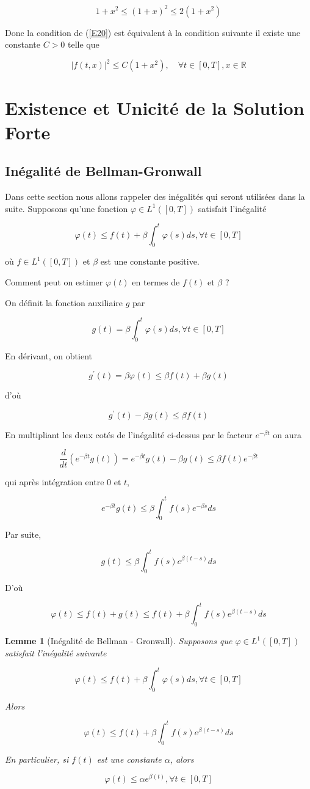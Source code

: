 \documentclass[A4paper,12pt]{report}
\newtheorem{lemma}{Lemme}[chapter]
\begin{document}
$$
1+x^{2} \leq(1+x)^{2} \leq 2\left(1+x^{2}\right)
$$

Donc la condition de (\ref{E20}) est équivalent à la condition suivante il existe une constante $C>0$ telle que

$$
|f(t, x)|^{2} \leq C\left(1+x^{2}\right), \quad \forall t \in [0, T], x \in \mathbb{R}
$$
\section{Existence et Unicité de la Solution Forte}


\subsection{Inégalité de Bellman-Gronwall}
Dans cette section nous allons rappeler des inégalités qui seront utilisées dans la suite. Supposons qu'une fonction $\varphi \in L^{1}([0, T])$ satisfait l'inégalité

$$
\varphi(t) \leq f(t)+\beta \int_{0}^{t} \varphi(s) d s, \forall t \in[0, T]
$$

où $f \in L^{1}([0, T])$ et $\beta$ est une constante positive.

Comment peut on estimer $\varphi(t)$ en termes de $f(t)$ et $\beta$ ?

On définit la fonction auxiliaire $g$ par

$$
g(t)=\beta \int_{0}^{t} \varphi(s) d s, \forall t \in [0, T]
$$

En dérivant, on obtient

$$
g^{\prime}(t)=\beta \varphi(t) \leq \beta f(t)+\beta g(t)
$$

d'où

$$
g^{\prime}(t)-\beta g(t) \leq \beta f(t)
$$

En multipliant les deux cotés de l'inégalité ci-dessus par le facteur $e^{-\beta t}$ on aura

$$
\frac{d}{d t}\left(e^{-\beta t} g(t)\right)=e^{-\beta t} g(t)-\beta g(t) \leq \beta f(t) e^{-\beta t}
$$

qui après intégration entre 0 et $t$,

$$
e^{-\beta t} g(t) \leq \beta \int_{0}^{t} f(s) e^{-\beta s} d s
$$

Par suite,

$$
g(t) \leq \beta \int_{0}^{t} f(s) e^{\beta(t-s)} d s
$$

D'où

$$
\varphi(t) \leq f(t)+g(t) \leq f(t)+\beta \int_{0}^{t} f(s) e^{\beta(t-s)} d s
$$
\begin{lemma}[Inégalité de Bellman - Gronwall] Supposons que $\varphi \in L^{1}([0, T])$ satisfait l'inégalité suivante

$$
\varphi(t) \leq f(t)+\beta \int_{0}^{t} \varphi(s) d s, \forall t \in[0, T]
$$

Alors

$$
\varphi(t) \leq f(t)+\beta \int_{0}^{t} f(s) e^{\beta(t-s)} d s
$$

En particulier, si $f(t)$ est une constante $\alpha$, alors

$$
\varphi(t) \leq \alpha e^{\beta(t)}, \forall t \in[0, T]
$$
\end{lemma}
\end{document}
